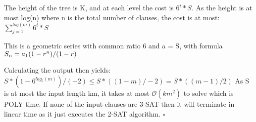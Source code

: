 \documentclass[11pt]{article}
\begin{document}
\begin{flushleft}
The height of the tree is K, and at each level the cost is $6^{i}*S$. As the height is at most log(n) where n is the total number of clauses, the cost is at most:  $\sum_{j=1}^{log(m)}6^{i}*S$ 

This is a geometric series with common ratio 6 and a = S, with formula $S\textsubscript{n} = a\textsubscript{1}(1 - r^{n}) / (1-r)$

Calculating the output then yields: $S * (1 - 6^{log_{6}(m)})/(-2) \leq S*((1 - m) / -2) = S*((m - 1) / 2)$
As S is at most the input length km, it takes at most $\mathcal{O}(km^2)$ to solve which is POLY time. If none of the input clauses are 3-SAT then it will terminate in linear time as it just executes the 2-SAT algorithm. $\square$

\end{flushleft}
\end{document}
